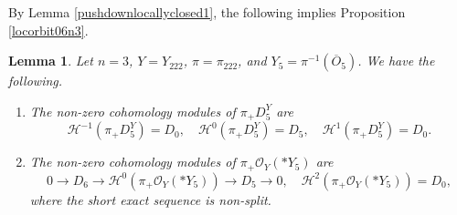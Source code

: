 \documentclass[11pt,reqno]{amsart}
\newcommand{\mc}[1]{\mathcal{#1}}
\newcommand{\ol}[1]{\overline{#1}}
\newtheorem{lemma}[theorem]{Lemma}
\numberwithin{equation}{section}
\begin{document}
By Lemma \ref{pushdownlocallyclosed1}, the following implies Proposition \ref{locorbit06n3}.

\begin{lemma}\label{push222to3}
Let $n=3$, $Y=Y_{222}$, $\pi=\pi_{222}$, and $Y_5=\pi^{-1}(\ol{O}_5)$. We have the following.
\begin{enumerate}
\item The non-zero cohomology modules of $\pi_{+}D^Y_5$ are
$$
\mc{H}^{-1}(\pi_{+}D^Y_5)=D_0,\quad \mc{H}^{0}(\pi_{+}D^Y_5)=D_5,\quad \mc{H}^{1}(\pi_{+}D^Y_5)=D_0.
$$
\item The non-zero cohomology modules of $\pi_{+}\mathcal{O}_Y(\ast Y_5)$ are
$$
0\to D_6 \to \mc{H}^0(\pi_{+}\mathcal{O}_Y(\ast Y_5))\to D_5\to 0,\quad \mc{H}^2(\pi_{+}\mathcal{O}_Y(\ast Y_5))=D_0,
$$
where the short exact sequence is non-split.
\end{enumerate}
\end{lemma}
\end{document}
